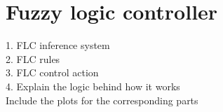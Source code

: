 \section{Fuzzy logic controller}

1. FLC inference system \\
2. FLC rules \\
3. FLC control action \\
4. Explain the logic behind how it works \\

Include the plots for the corresponding parts


\cite{ref1} 